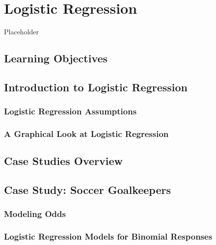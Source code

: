 \documentclass[
]{krantz}
\begin{document}
\hypertarget{ch-logreg}{%
\chapter{Logistic Regression}\label{ch-logreg}}

Placeholder

\hypertarget{learning-objectives-5}{%
\section{Learning Objectives}\label{learning-objectives-5}}

\hypertarget{introduction-to-logistic-regression}{%
\section{Introduction to Logistic Regression}\label{introduction-to-logistic-regression}}

\hypertarget{logistic-regression-assumptions}{%
\subsection{Logistic Regression Assumptions}\label{logistic-regression-assumptions}}

\hypertarget{a-graphical-look-at-logistic-regression}{%
\subsection{A Graphical Look at Logistic Regression}\label{a-graphical-look-at-logistic-regression}}

\hypertarget{case-studies-overview-1}{%
\section{Case Studies Overview}\label{case-studies-overview-1}}

\hypertarget{case-study-soccer-goalkeepers}{%
\section{Case Study: Soccer Goalkeepers}\label{case-study-soccer-goalkeepers}}

\hypertarget{modeling-odds}{%
\subsection{Modeling Odds}\label{modeling-odds}}

\hypertarget{logistic-regression-models-for-binomial-responses}{%
\subsection{Logistic Regression Models for Binomial Responses}\label{logistic-regression-models-for-binomial-responses}}
\end{document}
